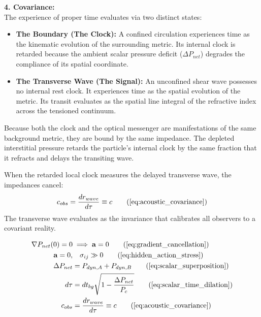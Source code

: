 \textbf{4. Covariance:} \\ %
The experience of proper time evaluates via two distinct states: %
\begin{itemize}[leftmargin=*]
    \item \textbf{The Boundary (The Clock):} A confined circulation experiences time as the kinematic evolution of the surrounding metric. Its internal clock is retarded because the ambient scalar pressure deficit ($\Delta P_{net}$) degrades the compliance of its spatial coordinate. %
    \item \textbf{The Transverse Wave (The Signal):} An unconfined shear wave possesses no internal rest clock. It experiences time as the spatial evolution of the metric. Its transit evaluates as the spatial line integral of the refractive index across the tensioned continuum. %
\end{itemize}
Because both the clock and the optical messenger are manifestations of the same background metric, they are bound by the same impedance. The depleted interstitial pressure retards the particle's internal clock by the same fraction that it refracts and delays the transiting wave. %

When the retarded local clock measures the delayed transverse wave, the impedances cancel: %
\begin{equation}
    c_{obs} = \frac{dr_{wave}}{d\tau} \equiv c \tag{\ref{eq:acoustic_covariance}}
\end{equation}
The transverse wave evaluates as the invariance that calibrates all observers to a covariant reality. %

\begin{tcolorbox}[recallbox, title={\ref{box:auxetic_symmetry_covariance}. Symmetry Breaking \& Covariance}] %
\begin{align}
    \nabla P_{net}(0) = 0 &\implies \mathbf{a} = 0 \tag{\ref{eq:gradient_cancellation}} \\
    \mathbf{a} = 0, &\quad \sigma_{ij} \gg 0 \tag{\ref{eq:hidden_action_stress}} \\
    \Delta P_{net} &= P_{dyn,A} + P_{dyn,B} \tag{\ref{eq:scalar_superposition}} \\
    d\tau &= dt_{bg} \sqrt{1 - \frac{\Delta P_{net}}{P_c}} \tag{\ref{eq:scalar_time_dilation}} \\
    c_{obs} &= \frac{dr_{wave}}{d\tau} \equiv c \tag{\ref{eq:acoustic_covariance}}
\end{align}
\end{tcolorbox}


